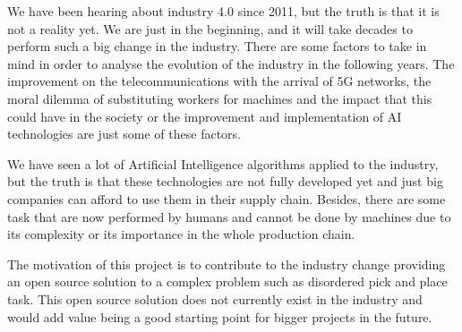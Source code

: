 We have been hearing about industry 4.0 since 2011, but the truth is that it is not a reality yet. We are just in the beginning, and it will take decades to perform such a big change in the industry. There are some factors to take in mind in order to analyse the evolution of the industry in the following years. The improvement on the telecommunications with the arrival of 5G networks, the moral dilemma of substituting workers for machines and the impact that this could have in the society or the improvement and implementation of AI technologies are just some of these factors. 

We have seen a lot of Artificial Intelligence algorithms applied to the industry, but the truth is that these technologies are not fully developed yet and just big companies can afford to use them in their supply chain. Besides, there are some task that are now performed by humans and cannot be done by machines due to its complexity or its importance in the whole production chain.

The motivation of this project is to contribute to the industry change providing an open source solution to a complex problem such as disordered pick and place task. This open source solution does not currently exist in the industry and would add value being a good starting point for bigger projects in the future.